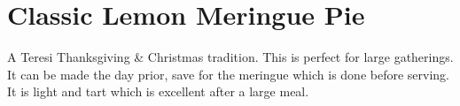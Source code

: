 \section[Lemon Meringue Pie]{Classic Lemon Meringue Pie}

\begin{recipestats}[
        servings=1 pie,
        preptime=1 \hour,
        bakingtime=20 \minute,
        source=\citefield{pie2004}{title}~\cite{pie2004},
    ]
\end{recipestats}

\begin{recipeabstract}
    A Teresi Thanksgiving \& Christmas tradition.
    This is perfect for large gatherings.
    It can be made the day prior, save for the meringue which is done before serving.
    It is light and tart which is excellent after a large meal.
\end{recipeabstract}

\begin{ingredientcolumns}
    \begin{ingredientblock}[filling]
        \\
        \\
        \\
        \\
        \\
        \\
        \\
    \end{ingredientblock}
    \begin{ingredientblock}[meringue]
        \\
        \\
        \\
        \\
    \end{ingredientblock}
\end{ingredientcolumns}

